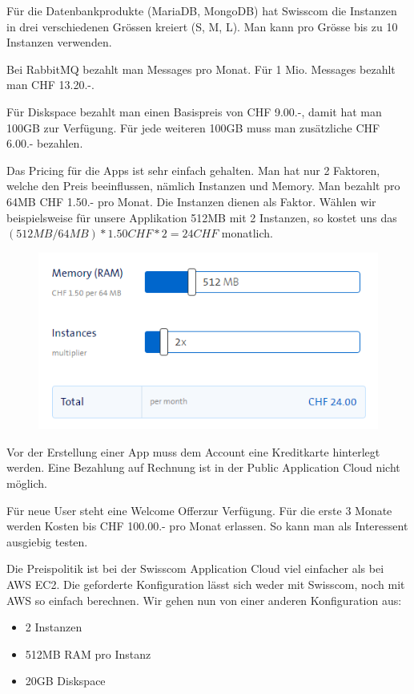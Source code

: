 Für die Datenbankprodukte (MariaDB, MongoDB) hat Swisscom die Instanzen in drei verschiedenen Grössen kreiert (S, M, L). Man kann pro Grösse bis zu 10 Instanzen verwenden. 

Bei RabbitMQ bezahlt man Messages pro Monat. Für 1 Mio. Messages bezahlt man CHF 13.20.-. 

Für Diskspace bezahlt man einen Basispreis von CHF 9.00.-, damit hat man 100GB zur Verfügung. Für jede weiteren 100GB muss man zusätzliche CHF 6.00.- bezahlen.

Das Pricing für die Apps ist sehr einfach gehalten. Man hat nur 2 Faktoren, welche den Preis beeinflussen, nämlich Instanzen und Memory. Man bezahlt pro 64MB CHF 1.50.- pro Monat. Die Instanzen dienen als Faktor. Wählen wir beispielsweise für unsere Applikation 512MB mit 2 Instanzen, so kostet uns das \((512MB/64MB)*1.50CHF*2=24CHF\) monatlich.
\begin{figure}[H]
\centering
\includegraphics[scale=0.8]{images/pricepermonth.png}
\end{figure}
Vor der Erstellung einer App muss dem Account eine Kreditkarte hinterlegt werden. Eine Bezahlung auf Rechnung ist in der Public Application Cloud nicht möglich.

Für neue User steht eine \glqq Welcome Offer\grqq zur Verfügung. Für die erste 3 Monate werden Kosten bis CHF 100.00.- pro Monat erlassen. So kann man als Interessent ausgiebig testen. 

Die Preispolitik ist bei der Swisscom Application Cloud viel einfacher als bei AWS EC2. Die geforderte Konfiguration lässt sich weder mit Swisscom, noch mit AWS so einfach berechnen. Wir gehen nun von einer anderen Konfiguration aus:
\begin{itemize}
\item 2 Instanzen
\item 512MB RAM pro Instanz
\item 20GB Diskspace
\end{itemize}

